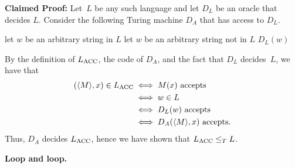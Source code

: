 \documentclass[11pt,addpoints,answers]{exam}
\newcommand{\lT}{\leq_T} %
\begin{document}
\begin{questions}
\begin{parts}
    \textbf{Claimed Proof:}
    Let~$L$ be any such language and let $D_L$ be an oracle that decides $L$.
    Consider the following Turing machine $D_A$ that has access to $D_L$. 
    
    \begin{center}
      \begin{minipage}{0.8\linewidth}
        \begin{algorithm}[H]
          \begin{algorithmic}[1]
            \State let $w$ be an arbitrary string in $L$
            \Else
            \State let $w$ be an arbitrary string not in $L$
            \EndIf
            \State \Return $D_L(w)$
            \EndFunction
          \end{algorithmic}
        \end{algorithm}
      \end{minipage}
    \end{center}
    By the definition of $L_{\text{ACC}}$, the code of $D_A$, and the fact that $D_L$ decides~$L$, we have that
    \begin{align*}
      (\langle M\rangle,x) \in L_{\text{ACC}}
      & \iff M(x) \text{ accepts } \\
      & \iff w \in L  \\
      & \iff D_L(w) \text{ accepts} \\
      & \iff D_A(\langle M\rangle,x) \text{ accepts}.
    \end{align*}
    Thus, $D_A$ decides $L_{\text{ACC}}$, hence we have shown that $\atm \lT L$.
    
    \begin{solution} \end{solution}
  \end{parts}
    
  \question \textbf{Loop and loop.} \label{loop-n-loop}
  \nopagebreak
  
\end{questions}
\end{document}
